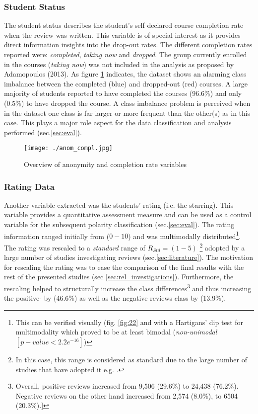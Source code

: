 \documentclass[
	a4paper,
	pdftex,
	12pt,	
	footinclude=true,
	fleqn,
	final,
	]{report}%
\begin{document}
\subsubsection*{Student Status}
\vspace{-0.4cm}
The student status describes the student's self declared course completion rate when 
the review was written. This variable is of special interest as it provides 
direct information insights into the drop-out rates. The different 
completion rates reported were: \emph{completed}, \emph{taking now} and \emph{dropped}. 
The group currently enrolled in the courses (\emph{taking now}) 
was not included in the analysis as proposed by Adamopoulos (2013).
As figure \ref{fig:15} indicates, the dataset shows an alarming class imbalance
between the completed (blue) and dropped-out (red) courses.
A large majority of students reported to have completed the courses (96.6\%) 
and only (0.5\%) to have dropped the course. A class imbalance problem is perceived 
when in the dataset one class is far larger or more frequent than the other(s) 
as in this case. This plays a major role aspect for the data classification 
and analysis performed (sec.\ref{sec:eval}).  
\begin{figure}[h]
 \centering
 \texttt{[image: ./anom\_compl.jpg]}
 \caption{Overview of anonymity and completion rate variables}
 \label{fig:15}
\end{figure}

\vspace{-0.6cm}
\subsubsection*{Rating Data}
\vspace{-0.3cm}
Another variable extracted was the students' rating (i.e. the starring). This variable provides 
a quantitative assessment measure and can be used as a control
variable for the subsequent polarity classification (sec.\ref{sec:eval}). 
The rating information ranged initially from ($0-10$) and was multimodally 
distributed\footnote{This can be verified visually (fig. \ref{fig:22} 
and with a Hartigans' dip test for multimodality 
which proved to be at least bimodal (\emph{non-unimodal}$[p-value < 2.2e^{-16}]$)}.
The rating was rescaled to a \emph{standard} range of $R_{Std}=(1-5)$ \footnote{
In this case, this range is considered as standard due to the large number of
studies that have adopted it e.g. \cite{Fang2015,Hu2006,Liu2004}.} adopted by a large number of 
studies investigating reviews (sec.\ref{sec:literature}). The motivation for rescaling the rating 
was to ease the comparison of the final results with the rest of 
the presented studies (sec \ref{sec:rel_investigations}). Furthermore, the rescaling helped 
to structurally increase the class differences\footnote{Overall, positive reviews 
increased from 9,506 (29.6\%) to 24,438 (76.2\%). Negative reviews on the other hand
increased from 2,574 (8.0\%), to 6504 (20.3\%).]} and thus increasing
the positive- by (46.6\%) as well as the negative reviews class by (13.9\%). 
\end{document}
